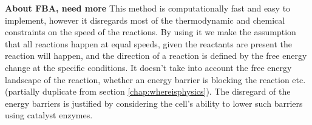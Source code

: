 \documentclass[10pt,a4paper]{article}
\begin{document}
	\textbf{About FBA, need more}
	This method is computationally fast and easy to implement, however it disregards most of the thermodynamic and chemical constraints on the speed of the reactions. By using it we make the assumption that all reactions happen at equal speeds, given the reactants are present the reaction will happen, and the direction of a reaction is defined by the free energy change at the specific conditions. It doesn't take into account the free energy landscape of the reaction, whether an energy barrier is blocking the reaction etc. (partially duplicate from section \ref{chap:whereisphysics}). The disregard of the energy barriers is justified by considering the cell's ability to lower such barriers using catalyst enzymes.



\end{document}
